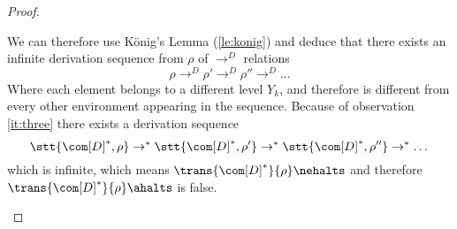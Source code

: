 \begin{proof}
\begin{itemize}
    We can therefore use König's Lemma (\ref{le:konig}) and deduce
    that there exists an infinite derivation sequence from \(\rho\) of \(\to^D\)
    relations
    \begin{equation*}
      \rho \to^D \rho' \to^D \rho'' \to^D \dots
    \end{equation*}
    Where each element belongs to a different level \(Y_k\), and
    therefore is different from every other environment appearing in
    the sequence. Because of observation \ref{it:three} there exists a
    derivation sequence
    \begin{equation*}
      \stt{\com[D]^*, \rho} \to^*\stt{\com[D]^*, \rho'} \to^* \stt{\com[D]^*, \rho''} \to^* \dots
    \end{equation*}
    which is infinite, which means \(\trans{\com[D]^*}{\rho}\nehalts\)
    and therefore \(\trans{\com[D]^*}{\rho} \ahalts\) is false.
    

\end{itemize}
\end{proof}
